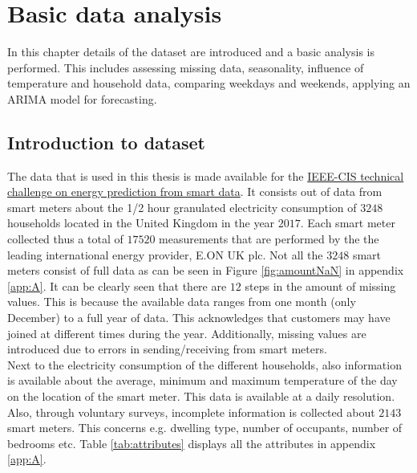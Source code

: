 \chapter{Basic data analysis}
\label{cha:1}
In this chapter details of the dataset are introduced and a basic analysis is performed. This includes assessing missing data, seasonality,  influence of temperature and household data, comparing weekdays and weekends, applying an ARIMA model for forecasting.


\section{Introduction to dataset}
The data that is used in this thesis is made available for the \href{https://ieee-dataport.org/competitions/ieee-cis-technical-challenge-energy-prediction-smart-meter-data}{IEEE-CIS technical challenge on energy prediction from smart data}. It consists out of data from smart meters about the 1/2 hour granulated electricity consumption of $3248$ households located in the United Kingdom in the year $2017$. Each smart meter collected thus a total of $17520$ measurements that are performed by the the leading international energy provider, E.ON UK plc. Not all the $3248$ smart meters consist of full data as can be seen in Figure \ref{fig:amountNaN} in appendix \ref{app:A}. It can be clearly seen that there are $12$ steps in the amount of missing values. This is because the available data ranges from one month (only December) to a full year of data. This acknowledges that customers may have joined at different times during the year. Additionally, missing values are introduced due to errors in sending/receiving from smart meters.\\
Next to the electricity consumption of the different households, also information is available about the average, minimum and maximum temperature of the day on the location of the smart meter. This data is available at a daily resolution. Also, through voluntary surveys, incomplete information is collected about $2143$ smart meters. This concerns e.g. dwelling type, number of occupants, number of bedrooms etc. Table \ref{tab:attributes} displays all the attributes in appendix \ref{app:A}.\\

%

